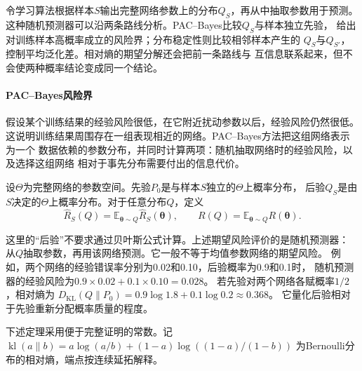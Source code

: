 令学习算法根据样本$S$输出完整网络参数上的分布$Q_S$，再从中抽取参数用于预测。
这种随机预测器可以沿两条路线分析。PAC--Bayes比较$Q_S$与样本独立先验，
给出对训练样本高概率成立的风险界；分布稳定性则比较相邻样本产生的
$Q_S$与$Q_{S'}$，控制平均泛化差。相对熵的期望分解还会把前一条路线与
互信息联系起来，但不会使两种概率结论变成同一个结论。

\paragraph{PAC--Bayes风险界}

假设某个训练结果的经验风险很低，在它附近扰动参数以后，经验风险仍然很低。
这说明训练结果周围存在一组表现相近的网络。PAC--Bayes方法把这组网络表示为一个
数据依赖的参数分布，并同时计算两项：随机抽取网络时的经验风险，以及选择这组网络
相对于事先分布需要付出的信息代价。

\begin{definition}
\label{def:pac-bayes-distributions}
设$\Theta$为完整网络的参数空间。先验$P_0$是与样本$S$独立的$\Theta$上概率分布，
后验$Q_S$是由$S$决定的$\Theta$上概率分布。对于任意分布$Q$，定义
\[
 \hat R_S(Q)=\mathbb E_{\bm\theta\sim Q}\hat R_S(\bm\theta),
 \qquad R(Q)=\mathbb E_{\bm\theta\sim Q}R(\bm\theta).
\]
\end{definition}

这里的“后验”不要求通过贝叶斯公式计算。上述期望风险评价的是随机预测器：
从$Q$抽取参数，再用该网络预测。它一般不等于均值参数网络的期望风险。
例如，两个网络的经验错误率分别为0.02和0.10，后验概率为0.9和0.1时，
随机预测器的经验风险为$0.9\times0.02+0.1\times0.10=0.028$。
若先验对两个网络各赋概率$1/2$，相对熵为
$D_{\mathrm{KL}}(Q\|P_0)=0.9\log1.8+0.1\log0.2\approx0.368$。
它量化后验相对于先验重新分配概率质量的程度。

下述定理采用便于完整证明的常数。记
$\operatorname{kl}(a\|b)=a\log(a/b)+(1-a)\log((1-a)/(1-b))$
为Bernoulli分布的相对熵，端点按连续延拓解释。

